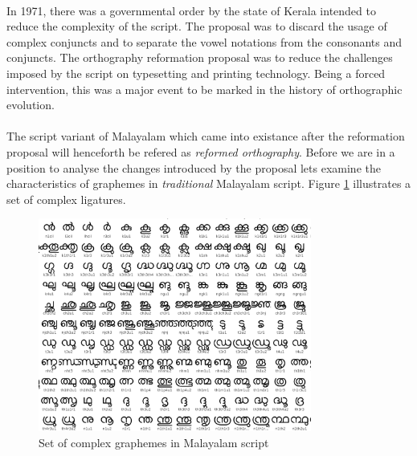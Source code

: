 \documentclass[10pt]{article}
\begin{document}
\paragraph{}
In 1971, there was a governmental order by the state of Kerala intended to reduce the complexity of the script. The proposal was to discard the usage of complex conjuncts and to separate the vowel notations from the consonants and conjuncts. The orthography reformation proposal was to reduce the challenges imposed by the script on typesetting and printing technology. Being a forced intervention, this was a major event to be marked in the history of orthographic evolution. 

\paragraph{}
The script variant of Malayalam which came into existance after the reformation proposal will henceforth be refered as \textit{reformed orthography}. Before we are in a position to analyse the changes introduced by the proposal lets examine the characteristics of graphemes in \textit{traditional} Malayalam script. Figure \ref{complexgrapheme} illustrates a set of complex ligatures. 

\begin{figure}[h!]
	\centering
	\includegraphics[width=0.8\textwidth]{images/complexgraphemes.png}
	\caption{Set of complex graphemes in Malayalam script}
	\label{complexgrapheme}
\end{figure}
\end{document}
